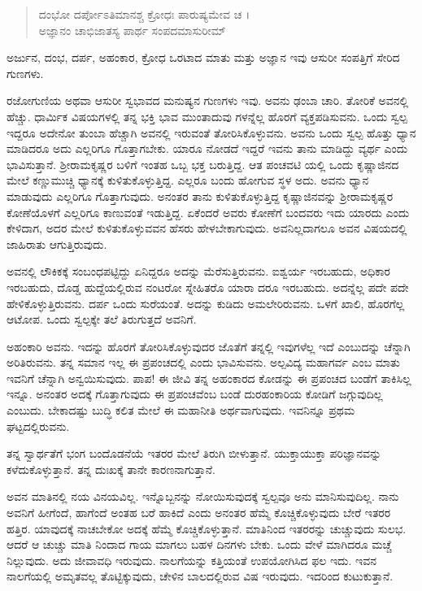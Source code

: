 \begin{verse}
ದಂಭೋ ದರ್ಪೋಽತಿಮಾನಶ್ಚ ಕ್ರೋಧಃ ಪಾರುಷ್ಯಮೇವ ಚ ।\\ಅಜ್ಞಾನಂ ಚಾಭಿಜಾತಸ್ಯ ಪಾರ್ಥ ಸಂಪದಮಾಸುರೀಮ್ 
\end{verse}

{\small ಅರ್ಜುನ, ದಂಭ, ದರ್ಪ, ಅಹಂಕಾರ, ಕ್ರೋಧ ಒರಟಾದ ಮಾತು ಮತ್ತು ಅಜ್ಞಾನ ಇವು ಆಸುರೀ ಸಂಪತ್ತಿಗೆ ಸೇರಿದ ಗುಣಗಳು.}

ರಜೋಗುಣಿಯ ಅಥವಾ ಆಸುರೀ ಸ್ವಭಾವದ ಮನುಷ್ಯನ ಗುಣಗಳು ಇವು. ಅವನು ಢಂಬಾ ಚಾರಿ. ತೋರಿಕೆ ಅವನಲ್ಲಿ ಹೆಚ್ಚು. ಧಾರ್ಮಿಕ ವಿಷಯಗಳಲ್ಲಿ ತನ್ನ ಭಕ್ತಿ ಭಾವ ಮುಂತಾದುವು ಗಳನ್ನೆಲ್ಲ ಹೊರಗೆ ವ್ಯಕ್ತಪಡಿಸುವನು. ಒಂದು ಸ್ವಲ್ಪ ಇದ್ದರೂ ಅದೇನೋ ತುಂಬಾ ಹೆಚ್ಚಾಗಿ ಅವನಲ್ಲಿ ಇರುವಂತೆ ತೋರಿಸಿಕೊಳ್ಳುವನು. ಅವನು ಒಂದು ಸ್ವಲ್ಪ ಹೊತ್ತು ಧ್ಯಾನ ಮಾಡಿದರೂ ಅದು ಎಲ್ಲರಿಗೂ ಗೊತ್ತಾಗಬೇಕು. ಯಾರೂ ನೋಡದೆ ಇದ್ದರೆ ಇವನು ತಾನು ಮಾಡಿದ್ದು ವ್ಯರ್ಥ ಎಂದು ಭಾವಿಸುತ್ತಾನೆ. ಶ್ರೀರಾಮಕೃಷ್ಣರ ಬಳಿಗೆ ಇಂತಹ ಒಬ್ಬ ಭಕ್ತ ಬರುತ್ತಿದ್ದ. ಆತ ಪಂಚವಟಿ ಯಲ್ಲಿ ಒಂದು ಕೃಷ್ಣಾಜಿನದ ಮೇಲೆ ಕಣ್ಣುಮುಚ್ಚಿ ಧ್ಯಾನಕ್ಕೆ ಕುಳಿತುಕೊಳ್ಳುತ್ತಿದ್ದ. ಎಲ್ಲರೂ ಬಂದು ಹೋಗುವ ಸ್ಥಳ ಅದು. ಅವನು ಧ್ಯಾನ ಮಾಡುವುದು ಎಲ್ಲರಿಗೂ ಗೊತ್ತಾಗುವುದು. ಅನಂತರ ತಾನು ಕುಳಿತುಕೊಳ್ಳುತ್ತಿದ್ದ ಕೃಷ್ಣಾಜಿನವನ್ನು ಶ್ರೀರಾಮಕೃಷ್ಣರ ಕೋಣೆಯೊಳಗೆ ಎಲ್ಲರಿಗೂ ಕಾಣುವಂತೆ ಇಡುತ್ತಿದ್ದ. ಏಕೆಂದರೆ ಅವರು ಕೋಣೆಗೆ ಬಂದವರು ಇದು ಯಾರದು ಎಂದು ಕೇಳಿದಾಗ, ಅದರ ಮೇಲೆ ಕುಳಿತುಕೊಳ್ಳುವವನ ಹೆಸರು ಹೇಳಬೇಕಾಗುವುದು. ಅವನಿಲ್ಲದಾಗಲೂ ಅವನ ವಿಷಯದಲ್ಲಿ ಜಾಹಿರಾತು ಆಗುತ್ತಿರುವುದು.

ಅವನಲ್ಲಿ ಲೌಕಿಕಕ್ಕೆ ಸಂಬಂಧಪಟ್ಟಿದ್ದು ಏನಿದ್ದರೂ ಅದನ್ನು ಮೆರೆಸುತ್ತಿರುವನು. ಐಶ್ವರ್ಯ ಇರಬಹುದು, ಅಧಿಕಾರ ಇರಬಹುದು, ದೊಡ್ಡ ಹುದ್ದೆಯಲ್ಲಿರುವ ನಂಟರೋ ಸ್ನೇಹಿತರೊ ಯಾರಾ ದರೂ ಇರಬಹುದು. ಅದನ್ನೆಲ್ಲ ಪದೇ ಪದೇ ಹೇಳಿಕೊಳ್ಳುತ್ತಿರುವನು. ದರ್ಪ ಒಂದು ಸುರೆಯಂತೆ. ಅದನ್ನು ಕುಡಿದು ಅಮಲೇರಿರುವನು. ಒಳಗೆ ಖಾಲಿ, ಹೊರಗೆಲ್ಲ ಆಟೋಪ. ಒಂದು ಸ್ವಲ್ಪಕ್ಕೇ ತಲೆ ತಿರುಗುತ್ತದೆ ಅವನಿಗೆ.

ಅಹಂಕಾರಿ ಅವನು. ಇದನ್ನು ಹೊರಗೆ ತೋರಿಸಿಕೊಳ್ಳುವುದರ ಜೊತೆಗೆ ತನ್ನಲ್ಲಿ ಇವುಗಳೆಲ್ಲ ಇದೆ ಎಂಬುದನ್ನು ಚೆನ್ನಾಗಿ ಅರಿತಿರುವನು. ತನ್ನ ಸಮಾನ ಇಲ್ಲ ಈ ಪ್ರಪಂಚದಲ್ಲಿ ಎಂದು ಭಾವಿಸುವನು. ಅಲ್ಪವಿದ್ಯ ಮಹಾಗರ್ವ ಎಂಬ ಮಾತು ಇವನಿಗೆ ಚೆನ್ನಾಗಿ ಅನ್ವಯಿಸುವುದು. ಪಾಪ! ಈ ಜೀವಿ ತನ್ನ ಅಹಂಕಾರದ ಕೋಡನ್ನು ಈ ಪ್ರಪಂಚದ ಬಂಡೆಗೆ ತಾಕಿಸಿಲ್ಲ ಇನ್ನೂ. ಅನಂತರ ಅದಕ್ಕೆ ಗೊತ್ತಾಗುವುದು ಈ ಪ್ರಪಂಚವೆಂಬ ಬಂಡೆ ದುರಹಂಕಾರಿಯ ಕೋಡಿಗೆ ಜಗ್ಗುವುದಿಲ್ಲ ಎಂಬುದು. ಬೇಕಾದಷ್ಟು ಬುದ್ಧಿ ಕಲಿತ ಮೇಲೆ ಈ ಮಹಾನೀತಿ ಅರ್ಥವಾಗುವುದು. ಇವನಿನ್ನೂ ಪ್ರಥಮ ಘಟ್ಟದಲ್ಲಿರುವನು.

ತನ್ನ ಸ್ವಾರ್ಥತೆಗೆ ಭಂಗ ಬಂದೊಡನೆಯೆ ಇತರರ ಮೇಲೆ ತಿರುಗಿ ಬೀಳುತ್ತಾನೆ. ಯುಕ್ತಾಯುಕ್ತಾ ಪರಿಜ್ಞಾನವನ್ನು ಕಳೆದುಕೊಳ್ಳುತ್ತಾನೆ. ತನ್ನ ದುಃಖಕ್ಕೆ ತಾನೇ ಕಾರಣನಾಗುತ್ತಾನೆ.

ಅವನ ಮಾತಿನಲ್ಲಿ ನಯ ವಿನಯವಿಲ್ಲ. ಇನ್ನೊಬ್ಬನನ್ನು ನೋಯಿಸುವುದಕ್ಕೆ ಸ್ವಲ್ಪವೂ ಅನು ಮಾನಿಸುವುದಿಲ್ಲ. ನಾನು ಅವನಿಗೆ ಹೀಗೆಂದೆ, ಹಾಗೆಂದೆ ಅಂತಹ ಬರೆ ಹಾಕಿದೆ ಎಂದು ಅನಂತರ ಹೆಮ್ಮೆ ಕೊಚ್ಚಿಕೊಳ್ಳುವುದು ಬೇರೆ ಇತರರ ಹತ್ತಿರ. ಯಾವುದಕ್ಕೆ ನಾಚಬೇಕೋ ಅದಕ್ಕೆ ಹೆಮ್ಮೆ ಕೊಚ್ಚಿಕೊಳ್ಳುತ್ತಾನೆ. ಮಾತಿನಿಂದ ಇತರರನ್ನು ಚುಚ್ಚುವುದು ಸುಲಭ. ಆದರೆ ಆ ಚುಚ್ಚು ಮಾತಿ ನಿಂದಾದ ಗಾಯ ಮಾಗಲು ಬಹಳ ದಿನಗಳು ಬೇಕು. ಒಂದು ವೇಳೆ ಮಾಗಿದರೂ ಮಚ್ಚೆ ನಿಲ್ಲುವುದು. ಅದು ಜೀವಾವಧಿ ಇರುವುದು. ನಾಲಗೆಯನ್ನು ಕತ್ತಿಯಂತೆ ಉಪಯೋಗಿಸಿದ ಫಲ ಇದು. ಇವನ ನಾಲಗೆಯಲ್ಲಿ ಅಮೃತವಲ್ಲ ತೊಟ್ಟಿಕ್ಕುವುದು, ಚೇಳಿನ ಬಾಲದಲ್ಲಿರುವ ವಿಷ ಇರುವುದು. ಇದರಿಂದ ಕುಟುಕುತ್ತಾನೆ.


